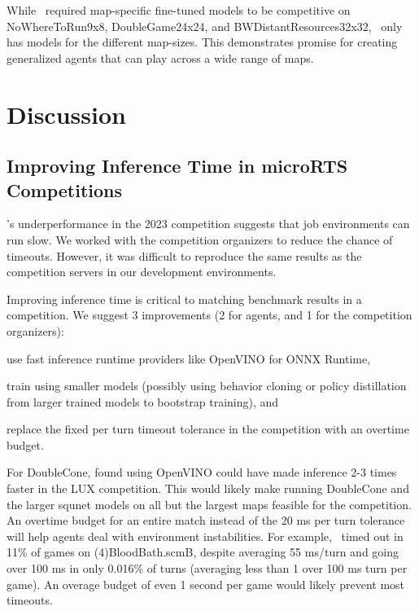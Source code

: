 \documentclass[conference]{IEEEtran}
\newcommand{\mapname}[1]{#1} %
\begin{document}
While \agentName\ required map-specific fine-tuned models to be competitive on
\mapname{NoWhereToRun9x8}, \mapname{DoubleGame24x24}, and \mapname{BWDistantResources32x32},
\bcPPOAgent\ only has models for the different map-sizes. This demonstrates promise for
creating generalized agents that can play across a wide range of maps.

\section{Discussion}
\subsection{Improving Inference Time in microRTS Competitions}
\agentName's underperformance in the 2023 competition suggests that job
environments can run slow. We worked with the competition
organizers to reduce the chance of timeouts. However, it was difficult to reproduce the same results as
the competition servers in our development environments.

Improving inference time is critical to matching benchmark results in a competition.
We suggest 3 improvements (2 for agents, and 1 for the competition organizers):
\begin{inparaenum}[(1)]
    \item use fast inference runtime providers like OpenVINO for ONNX Runtime,
    \item train using smaller models (possibly using behavior cloning or policy
    distillation from larger trained models to bootstrap training), and
    \item replace the fixed per turn timeout tolerance in the competition with an overtime
    budget.
\end{inparaenum}
For DoubleCone, \cite{Ferdinand2021doublecone} found using OpenVINO could have made
inference 2-3 times faster in the LUX competition. This would likely make running
DoubleCone and the larger squnet models on all but the largest maps feasible for the
competition. An overtime budget for an entire match instead of the 20 ms per turn
tolerance will help agents deal with environment instabilities. For example,
\bcPPOAgent\ timed out in 11\% of games on \mapname{(4)BloodBath.scmB}, despite
averaging 55 ms/turn and going over 100 ms in only 0.016\% of turns (averaging less than
1 over 100 ms turn per game). An overage budget of even 1 second per game would likely
prevent most timeouts.
\end{document}
